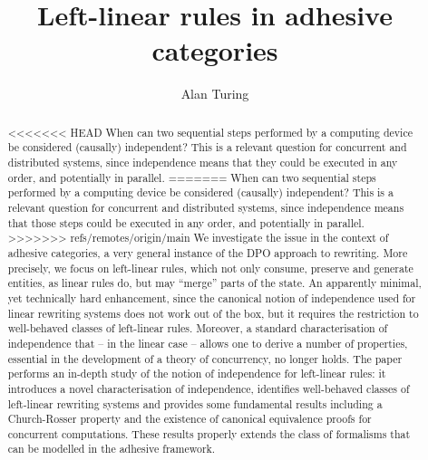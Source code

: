 \documentclass[a4paper,UKenglish,cleveref,pdftex,thm-restate,numberwithinsect,anonymous]{lipics}
\title{Left-linear rules in adhesive categories}
\author{Alan Turing} 
{Department of Mathematics, Somewhere}
{alan@turing.com}{}{}
\begin{document}
\maketitle


\begin{abstract}
<<<<<<< HEAD
  When can two sequential steps performed by a computing device be considered (causally) independent? 
  This is a relevant question for concurrent and distributed systems, since independence
  means that they could be executed in any order, and potentially in parallel.
=======
  When can two sequential steps performed by a computing device be
  considered (causally) independent?  This is a relevant question for
  concurrent and distributed systems, since independence means that
  those steps could be executed in any order, and potentially in parallel.
>>>>>>> refs/remotes/origin/main
  We investigate the issue in the context of adhesive categories, a
  very general instance of the DPO approach to rewriting. More
  precisely, we focus on left-linear rules, which not only consume,
  preserve and generate entities, as linear rules do, but may
  ``merge'' parts of the state.
  An apparently minimal, yet technically hard enhancement, 
  since the canonical notion of independence used for linear rewriting
  systems does not work out of the box, but it requires the
  restriction to well-behaved classes of left-linear rules.
  Moreover, a standard characterisation of independence that -- in the
  linear case -- allows one to derive a number of properties,
  essential in the development of a theory of concurrency, no longer
  holds.
  The paper performs an in-depth study of the notion of independence
  for left-linear rules: it introduces a novel characterisation of
  independence, identifies well-behaved classes of left-linear
  rewriting systems and provides some fundamental results including a
  Church-Rosser property and the existence of canonical equivalence
  proofs for concurrent computations. These results properly extends
  the class of formalisms that can be modelled in the adhesive
  framework.
\end{abstract}
\end{document}
